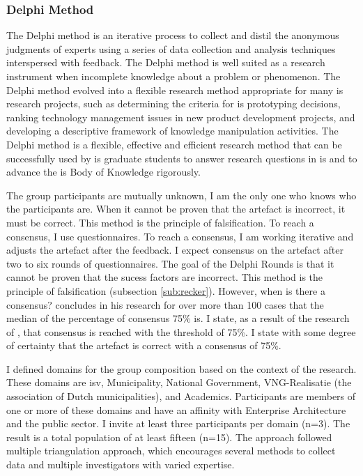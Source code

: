 \subsubsection{Delphi Method}
\label{subsub:delphimethod}
The Delphi method is an iterative process to collect and distil the anonymous judgments of experts using a series of data collection and analysis techniques interspersed with feedback. The Delphi method is well suited as a research instrument when incomplete knowledge about a problem or phenomenon. The Delphi method evolved into a flexible research method appropriate for many \acrfull{is} research projects, such as determining the criteria for \acrshort{is} prototyping decisions, ranking technology management issues in new product development projects, and developing a descriptive framework of knowledge manipulation
activities. The Delphi method is a flexible, effective and efficient research method that can be successfully used by \acrshort{is} graduate students to answer research questions in \acrshort{is} and to advance the \acrshort{is} Body of Knowledge rigorously. \parencite{Skulmoski2007}

The group participants are mutually unknown, I am the only one who knows who the participants are. When it cannot be proven that the artefact is incorrect, it must be correct. This method is the principle of falsification. To reach a consensus, I use questionnaires. To reach a consensus, I am working iterative and adjusts the artefact after the feedback. I expect consensus on the artefact after two to six rounds of questionnaires. The goal of the Delphi Rounds is that it cannot be proven that the sucess factors are incorrect. This method is the principle of falsification (subsection \ref{sub:recker}). However, when is there a consensus? \textcite[p. 404]{Diamond2014} concludes in his research for over more than 100 cases that the median of the percentage of consensus 75\% is. I state, as a result of the research of \textcite{Diamond2014}, that consensus is reached with the threshold of 75\%. I state with some degree of certainty that the artefact is correct with a consensus of 75\%.

I defined domains for the group composition based on the context of the research. These domains are \acrfull{isv}, Municipality, National Government, VNG-Realisatie (the association of Dutch municipalities), and Academics. Participants are members of one or more of these domains and have an affinity with Enterprise Architecture and the public sector. I invite at least three participants per domain (n=3). The result is a total population of at least fifteen (n=15). The approach followed \textcite{Denzin2017} multiple triangulation approach, which encourages several methods to collect data and multiple investigators with varied expertise.

